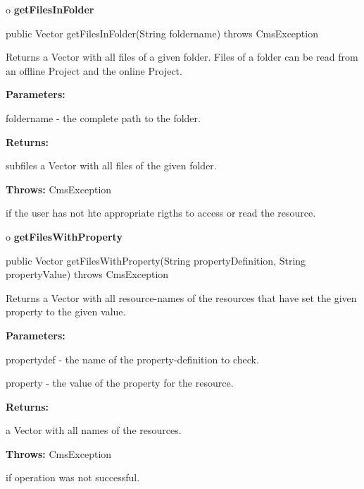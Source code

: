 o {\bf getFilesInFolder} 

\begin{PRE}
 public Vector getFilesInFolder(String foldername) throws CmsException
\end{PRE}

\begin{description}
\htmlDD Returns a Vector with all files of a given folder. \htmlBR
Files of a folder can be read from an offline Project and the online Project. 

\begin{description}
\item {\bf Parameters:}  

foldername - the complete path to the folder.  
\item {\bf Returns:}  

subfiles a Vector with all files of the given folder.  
\item {\bf Throws:} CmsException  

if the user has not hte appropriate rigths to access or read the resource.  
\end{description}

\end{description}

o {\bf getFilesWithProperty} 

\begin{PRE}
 public Vector getFilesWithProperty(String propertyDefinition,
                                    String propertyValue) throws CmsException
\end{PRE}

\begin{description}
\htmlDD Returns a Vector with all resource-names of the resources that have
set the given property to the given value. 

\begin{description}
\item {\bf Parameters:}  

propertydef - the name of the property-definition to check.  

property - the value of the property for the resource.  
\item {\bf Returns:}  

a Vector with all names of the resources.  
\item {\bf Throws:} CmsException  

if operation was not successful.  
\end{description}

\end{description}

